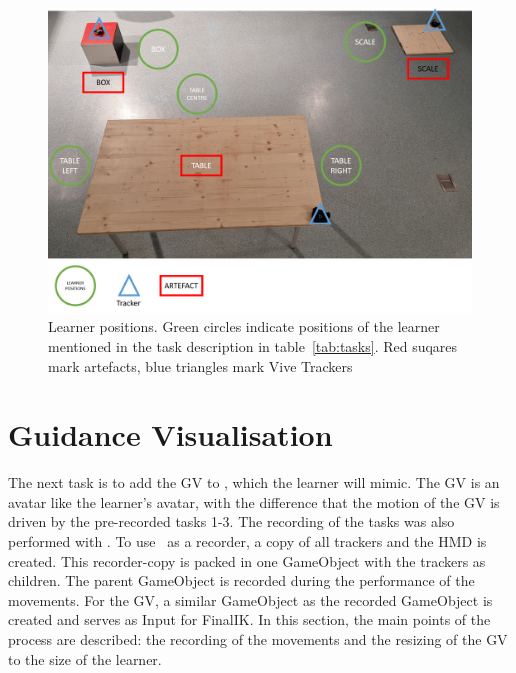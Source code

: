 \begin{figure}[htb]
	\centering
	\includegraphics[width=\textwidth]{figures/learner_positions.png}
	\caption[Learner positions]{Learner positions. Green circles indicate positions of the learner mentioned in the task description in table~\ref{tab:tasks}. Red suqares mark artefacts, blue triangles mark Vive Trackers}
	\label{fig:learner_positions}
\end{figure}

\section{Guidance Visualisation}
\label{sec:gv}
The next task is to add the GV to \exgo, which the learner will mimic. The GV is an avatar like the learner's avatar, with the difference that the motion of the GV is driven by the pre-recorded tasks 1-3. The recording of the tasks was also performed with \exgo. To use \exgo\ as a recorder, a copy of all trackers and the HMD is created. This recorder-copy is packed in one GameObject with the trackers as children. The parent GameObject is recorded during the performance of the movements. For the GV, a similar GameObject as the recorded GameObject is created and serves as Input for FinalIK. In this section, the main points of the process are described: the recording of the movements and the resizing of the GV to the size of the learner.\\

